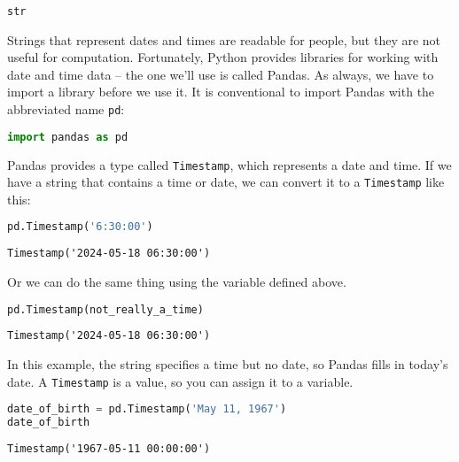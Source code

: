 \begin{lstlisting}[style=output]
str
\end{lstlisting}

Strings that represent dates and times are readable for people, but they
are not useful for computation. Fortunately, Python provides libraries
for working with date and time data -- the one we'll use is called
Pandas. As always, we have to import a library before we use it. It is
conventional to import Pandas with the abbreviated name
\passthrough{\lstinline!pd!}:

\begin{lstlisting}[language=Python,style=source]
import pandas as pd
\end{lstlisting}

Pandas provides a type called \passthrough{\lstinline!Timestamp!}, which
represents a date and time. If we have a string that contains a time or
date, we can convert it to a \passthrough{\lstinline!Timestamp!} like
this:

\begin{lstlisting}[language=Python,style=source]
pd.Timestamp('6:30:00')
\end{lstlisting}

\begin{lstlisting}[style=output]
Timestamp('2024-05-18 06:30:00')
\end{lstlisting}

Or we can do the same thing using the variable defined above.

\begin{lstlisting}[language=Python,style=source]
pd.Timestamp(not_really_a_time)
\end{lstlisting}

\begin{lstlisting}[style=output]
Timestamp('2024-05-18 06:30:00')
\end{lstlisting}

In this example, the string specifies a time but no date, so Pandas
fills in today's date. A \passthrough{\lstinline!Timestamp!} is a value,
so you can assign it to a variable.

\begin{lstlisting}[language=Python,style=source]
date_of_birth = pd.Timestamp('May 11, 1967')
date_of_birth
\end{lstlisting}

\begin{lstlisting}[style=output]
Timestamp('1967-05-11 00:00:00')
\end{lstlisting}

